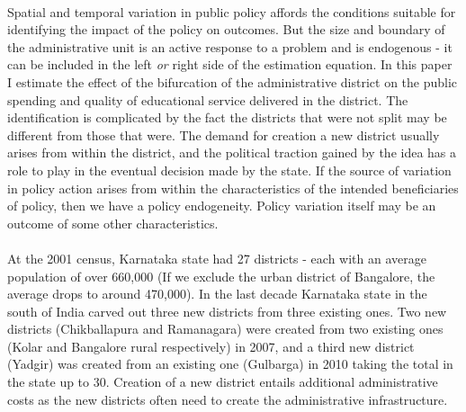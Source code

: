\documentclass[12pt, a4paper]{article}
\begin{document}
\paragraph{} Spatial and temporal variation in public policy affords the conditions suitable for identifying the impact of the policy on outcomes. But the size and boundary of the administrative unit is an active response to a problem and is endogenous - it can be included in the left \textit{or} right side of the estimation equation. In this paper I estimate the effect of the bifurcation of the administrative district on the public spending and quality of educational service delivered in the district. The identification is complicated by the fact the districts that were not split may be different from those that were. The demand for creation a new district usually arises from within the district, and the political traction gained by the idea has a role to play in the eventual decision made by the state. If the source of variation in policy action arises from within the characteristics of the intended beneficiaries of policy, then we have a policy endogeneity. Policy variation itself may be an outcome of some other characteristics. 
\paragraph{} At the 2001 census, Karnataka state had 27 districts - each with an average population of over 660,000 (If we exclude the urban district of Bangalore, the average drops to around 470,000). In the last decade Karnataka state in the south of India carved out three new districts from three existing ones. Two new districts (Chikballapura and Ramanagara) were created from two existing ones (Kolar and Bangalore rural respectively) in 2007, and a third new district (Yadgir) was created from an existing one (Gulbarga) in 2010 taking the total in the state up to 30. Creation of a new district entails additional administrative costs as the new districts often need to create the administrative infrastructure.


\printbibliography
\end{document}
